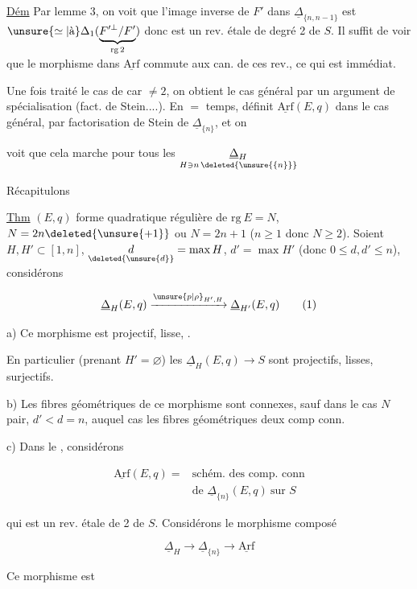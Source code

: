 \uline{Dém} Par lemme 3, on voit que l'image inverse de $F'$ dans $\underline\Delta_{\{n,n-1\}}$ est $\unsure{\simeq|\text{à}}\Delta_1(\underbrace{F'^\perp/F'}_{\mathrm{rg}\,2})$ donc est un rev. étale de degré 2 de $S$. Il suffit de voir que le morphisme  dans $\underline{\mathrm{Arf}}$ commute aux  can. de ces rev., ce qui est immédiat.

Une fois traité le cas de car $\neq2$,  on obtient le cas général par un argument de spécialisation (fact. de Stein....). En $=$ temps,  définit $\underline{\mathrm{Arf}}(E,q)$ dans le cas général, par factorisation de Stein de $\underline\Delta_{\{n\}}$, et on

voit que cela marche pour tous les $\underset{\substack{H\ni n\,\deleted{\unsure{\{n\}}}}}{\underline\Delta_H}$ 


Récapitulons

\uline{Thm} $(E,q)$ forme quadratique régulière de $\mathrm{rg}\ E=N$, $N=2n\deleted{\unsure{+1}}$ ou $N=2n+1$ ($n\geq1$ donc $N\geq2$). Soient $H,H'\subset[1,n]$, $\underset{\deleted{\unsure{d}}}{d}=\max H$, $d'=\max H'$ (donc $0\leq d,d'\leq n$), considérons

\[
\underline\Delta_H(E,q)\xrightarrow{\unsure{p|\rho}_{H',H}}\underline\Delta_{H'}(E,q)\tag*{(1)}
\]

a) Ce morphisme est projectif,  lisse,  .

 En particulier (prenant $H'=\varnothing$) les $\underline\Delta_H(E,q)\to S$ sont projectifs, lisses, surjectifs.

b) Les fibres géométriques de ce morphisme sont  connexes, sauf dans le cas $N$ pair, $d'<d=n$, auquel cas les fibres géométriques  deux comp conn.

c) Dans le  , considérons

\[
\begin{aligned}
\underline{\mathrm{Arf}}(E,q)={}&\text{schém. des comp. conn}\\
&\text{de }\underline\Delta_{\{n\}}(E,q)\ \text{sur }S
\end{aligned}
\]

qui est un rev. étale de  2 de $S$. Considérons  le  morphisme composé

\[
\underline\Delta_H\longrightarrow\underline\Delta_{\{n\}}\longrightarrow\underline{\mathrm{Arf}}
\]

 Ce morphisme est

